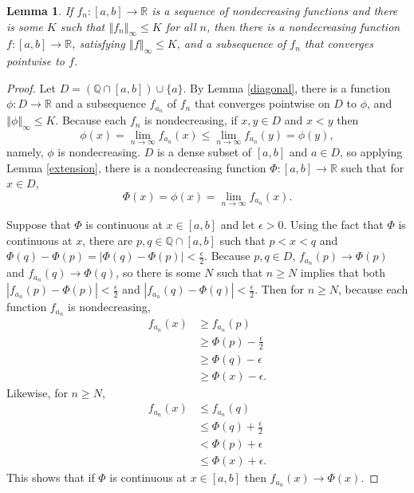 \documentclass{article}
\newcommand{\norm}[1]{\left\Vert #1 \right\Vert}
\newtheorem{lemma}[theorem]{Lemma}
\theoremstyle{definition}
\begin{document}
\begin{lemma}
If $f_n:[a,b] \to \mathbb{R}$ is a sequence of nondecreasing functions and there is some $K$ such that
$\norm{f_n}_\infty \leq K$ for all $n$, then there is a nondecreasing function $f:[a,b] \to \mathbb{R}$, satisfying $\norm{f}_\infty \leq K$,
and a subsequence of $f_n$ that converges pointwise to $f$.
\label{pointwiselemma}
\end{lemma}
\begin{proof}
Let $D=(\mathbb{Q} \cap [a,b]) \cup \{a\}$.  By Lemma \ref{diagonal}, there is a function $\phi:D \to \mathbb{R}$ and a subsequence
$f_{a_n}$ of $f_n$ that converges pointwise on $D$ to $\phi$, and $\norm{\phi}_\infty \leq K$. Because each $f_n$ is nondecreasing,
if $x,y \in D$ and $x<y$ then
\[
\phi(x)=\lim_{n \to \infty} f_{a_n}(x) \leq \lim_{n \to \infty} f_{a_n}(y) = \phi(y),
\]
namely, $\phi$ is nondecreasing. $D$ is a dense subset of $[a,b]$ and $a \in D$, so applying Lemma \ref{extension},
there is a nondecreasing function $\Phi:[a,b] \to \mathbb{R}$ such that for $x \in D$,
\[
\Phi(x) =\phi(x)= \lim_{n \to \infty} f_{a_n}(x).
\]

Suppose that $\Phi$ is continuous at $x \in [a,b]$ and let $\epsilon>0$.
Using the fact that $\Phi$ is continuous at $x$, there are $p,q \in \mathbb{Q} \cap [a,b]$ such that $p<x<q$ and
$\Phi(q)-\Phi(p)=|\Phi(q)-\Phi(p)|<\frac{\epsilon}{2}$. Because $p,q \in D$, $f_{a_n}(p) \to \Phi(p)$ and $f_{a_n}(q) \to \Phi(q)$, so there
is some $N$ such that $n \geq N$ implies that both $|f_{a_n}(p)-\Phi(p)|<\frac{\epsilon}{2}$ and $|f_{a_n}(q)-\Phi(q)| < \frac{\epsilon}{2}$. Then for $n \geq N$, because each function
$f_{a_n}$ is nondecreasing,
\begin{align*}
f_{a_n}(x)&\geq f_{a_n}(p)\\
&\geq \Phi(p)-\frac{\epsilon}{2}\\
&\geq \Phi(q)-\epsilon\\
&\geq \Phi(x)-\epsilon.
\end{align*}
Likewise, for $n \geq N$,
\begin{align*}
f_{a_n}(x)&\leq f_{a_n}(q)\\
&\leq \Phi(q)+\frac{\epsilon}{2}\\
&< \Phi(p)+\epsilon\\
&\leq \Phi(x)+\epsilon.
\end{align*}
This shows that if $\Phi$ is continuous at $x \in [a,b]$ then $f_{a_n}(x) \to \Phi(x)$. 


\end{proof}
\end{document}
